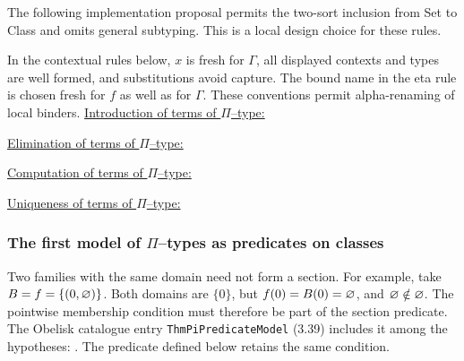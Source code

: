 The following implementation proposal permits the two-sort inclusion
from Set to Class and omits general subtyping. This is a local design
choice for these rules.
\begin{prooftree}
\end{prooftree}
In the contextual rules below, $x$ is fresh for $\Gamma$, all displayed
contexts and types are well formed, and substitutions avoid capture.
The bound name in the eta rule is chosen fresh for $f$ as well as for
$\Gamma$. These conventions permit alpha-renaming of local binders.
\underline{Introduction of terms of $\Pi$--type:}
\begin{prooftree}
\end{prooftree}
\underline{Elimination of terms of $\Pi$--type:}
\begin{prooftree}
\end{prooftree}
\underline{Computation of terms of $\Pi$--type:}
\begin{prooftree}
\end{prooftree}
\underline{Uniqueness of terms of $\Pi$--type:}
\begin{prooftree}
\end{prooftree}

\subsubsection{The first model of $\Pi$--types as predicates on classes}
\begin{remark}
Two families with the same domain need not form a section. For example,
take $B=f=\{(0,\varnothing)\}$. Both domains are $\{0\}$, but
$f(0)=B(0)=\varnothing$, and $\varnothing\notin\varnothing$. The pointwise
membership condition must therefore be part of the section predicate. The
Obelisk catalogue entry \texttt{ThmPiPredicateModel} (3.39) includes it
among the hypotheses: .
The predicate defined below retains the same condition.
\end{remark}

